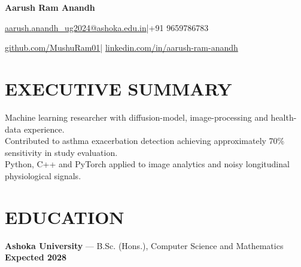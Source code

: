 \documentclass[10pt,a4paper]{article}
\begin{document}
{\LARGE\bfseries Aarush Ram Anandh}\par\vspace{4pt}
\href{mailto:aarush.anandh_ug2024@ashoka.edu.in}{aarush.anandh\_ug2024@ashoka.edu.in}\quad|\quad +91 9659786783\par\vspace{2pt}
\href{https://github.com/MushuRam01}{github.com/MushuRam01}\quad|\quad
\href{https://www.linkedin.com/in/aarush-ram-anandh/}{linkedin.com/in/aarush-ram-anandh}\par

\section{EXECUTIVE SUMMARY}
Machine learning researcher with diffusion-model, image-processing and health-data experience.\\
Contributed to asthma exacerbation detection achieving approximately 70\% sensitivity in study evaluation.\\
Python, C++ and PyTorch applied to image analytics and noisy longitudinal physiological signals.\par
\section{EDUCATION}
\textbf{Ashoka University} --- B.Sc. (Hons.), Computer Science and Mathematics \hfill \textbf{Expected 2028}
\end{document}
